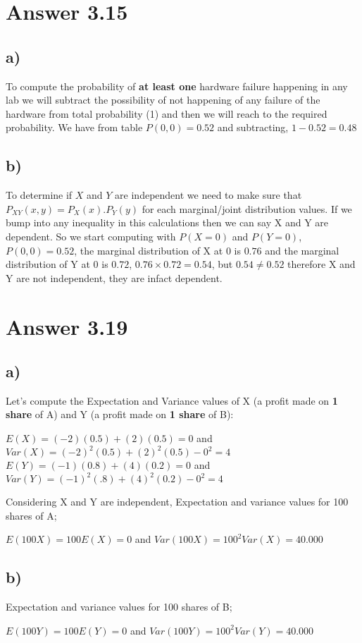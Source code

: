 \documentclass[12pt]{article}
\begin{document}
\section*{Answer 3.15}
\subsection*{a)}
To compute the probability of \textbf{at least one} hardware failure happening in any lab we will subtract the possibility of not happening of any failure of the hardware from total probability (1) and then we will reach to the required probability. We have from table $P(0,0) = 0.52$ and subtracting, $1 - 0.52 = 0.48$
\subsection*{b)}
To determine if $X$ and $Y$ are independent we need to make sure that $P_{XY}(x,y)=P_X(x).P_Y(y)$ for each marginal/joint distribution values. If we bump into any inequality in this calculations then we can say X and Y are dependent. So we start computing with $P(X=0)$ and $P(Y=0)$, $P(0,0)=0.52$, the marginal distribution of X at 0 is $0.76$ and the marginal distribution of Y at 0 is $0.72$, $0.76 \times 0.72=0.54$, but $0.54 \neq 0.52$ therefore X and Y are not independent, they are infact dependent.

\section*{Answer 3.19}
\subsection*{a)}
Let's compute the Expectation and Variance values of X (a profit made on \textbf{1 share} of A) and Y (a profit made on \textbf{1 share} of B):

\begin{center}
$E(X) =(-2)(0.5) + (2)(0.5) = 0 $ and 
$Var(X) = (-2)^2 (0.5) + (2)^2 (0.5)-0^2 = 4$
$E(Y) = (-1)(0.8) + (4)(0.2) = 0$ and
$Var(Y)=(-1)^2(.8)+(4)^2(0.2)-0^2 = 4$
\end{center} 
Considering X and Y are independent, Expectation and variance values for 100 shares of A;
\begin{center}
$E(100X) = 100E(X) = 0$ and $Var(100X) = 100^2 Var(X) = 40.000 $
\end{center}
\subsection*{b)}
Expectation and variance values for 100 shares of B;
\begin{center}
$E(100Y) = 100E(Y) = 0$ and $Var (100Y) = 100^2 Var(Y) = 40.000$
\end{center}
\end{document}
